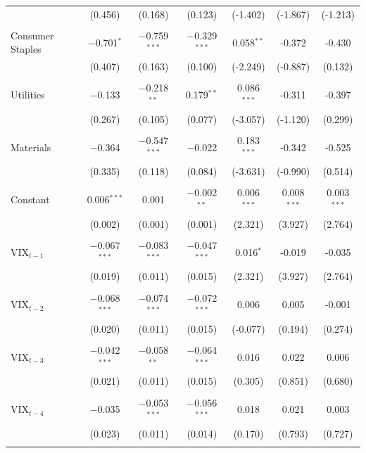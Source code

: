 \documentclass[11pt,a4paper,oldfontcommands]{memoir}
\begin{document}
{\begin{table}[H]
{\begin{tabular}{@{\extracolsep{0pt}}lccc|ccc}
  & (0.456) & (0.168) & (0.123)  & (-1.402) &  (-1.867)    &  (-1.213) \\ 
  & & \\ 
 Consumer Staples & $-$0.701$^{*}$ & $-$0.759$^{***}$ & $-$0.329$^{***}$  & 0.058$^{**}$ & -0.372  &  -0.430 \\ 
  & (0.407) & (0.163) & (0.100)   & (-2.249) &  (-0.887)    &  (0.132) \\ 
  & & \\ 
 Utilities & $-$0.133 & $-$0.218$^{**}$ & 0.179$^{**}$ & 0.086$^{***}$ & -0.311  &  -0.397 \\ 
  & (0.267) & (0.105) & (0.077)  & (-3.057) &  (-1.120)  &    (0.299)  \\ 
  & & \\ 
 Materials & $-$0.364 & $-$0.547$^{***}$ & $-$0.022 & 0.183$^{***}$ & -0.342  &  -0.525 \\ 
  & (0.335) & (0.118) & (0.084)  & (-3.631)  & (-0.990)   &   (0.514) \\ 
  & & \\ 
 Constant & 0.006$^{***}$ & 0.001 & $-$0.002$^{**}$  & 0.006$^{***}$ &  0.008$^{***}$   &  0.003$^{***}$\\ 
  & (0.002) & (0.001) & (0.001)  & (2.321)  &  (3.927)    &   (2.764) \\ 
  & & \\ 
 VIX$_{t-1}$ & $-$0.067$^{***}$ & $-$0.083$^{***}$ & $-$0.047$^{***}$  & 0.016$^{*}$ & -0.019  &  -0.035\\ 
  & (0.019) & (0.011) & (0.015)  & (2.321)  &  (3.927)    &   (2.764) \\ 
  & & \\ 
 VIX$_{t-2}$ & $-$0.068$^{***}$ & $-$0.074$^{***}$ & $-$0.072$^{***}$  & 0.006 & 0.005 &   -0.001 \\ 
  & (0.020) & (0.011) & (0.015)   & (-0.077) &  (0.194)  &    (0.274) \\ 
  & & \\ 
 VIX$_{t-3}$ & $-$0.042$^{***}$ & $-$0.058$^{**}$ & $-$0.064$^{***}$  & 0.016 & 0.022   &  0.006  \\ 
  & (0.021) & (0.011) & (0.015)   & (0.305)  &  (0.851)   &    (0.680)  \\ 
  & & \\ 
 VIX$_{t-4}$ & $-$0.035 & $-$0.053$^{***}$ & $-$0.056$^{***}$  & 0.018 & 0.021  &   0.003  \\ 
  & (0.023) & (0.011) & (0.014)   & (0.170)  &  (0.793)   &    (0.727) \\ 
  & & \\ 

\end{tabular}}
\end{table}}
\end{document}
